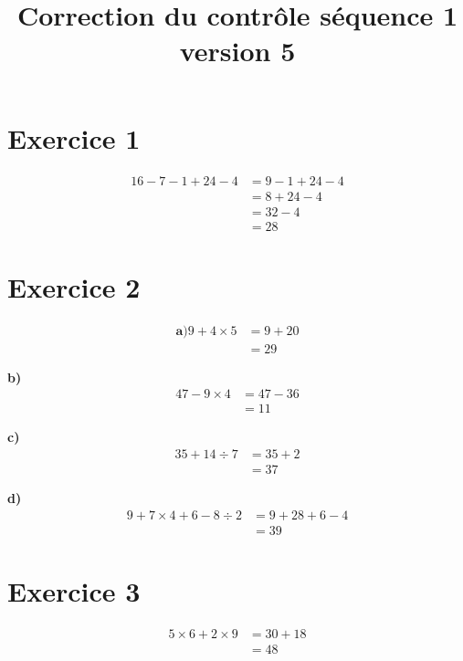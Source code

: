 \documentclass[12pt]{extarticle}
\title{\textbf{Correction du contrôle séquence 1 version 5}}
\author{}
\date{}
\begin{document}
\maketitle

\section*{Exercice 1}
\begin{align*}
16 - 7 - 1 + 24 - 4 &= 9 - 1 + 24 - 4 \\
                     &= 8 + 24 - 4 \\
                     &= 32 - 4 \\
                     &= 28
\end{align*}

\section*{Exercice 2}

\begin{align*}
\textbf{a)}
9 + 4 \times 5 &= 9 + 20 \\
               &= 29
\end{align*}

\textbf{b)}
\begin{align*}
47 - 9 \times 4 &= 47 - 36 \\
                &= 11
\end{align*}

\textbf{c)}
\begin{align*}
35 + 14 \div 7 &= 35 + 2 \\
               &= 37
\end{align*}

\textbf{d)}
\begin{align*}
9 + 7 \times 4 + 6 - 8 \div 2 &= 9 + 28 + 6 - 4 \\
                              &= 39
\end{align*}

\section*{Exercice 3}
\begin{align*}
5 \times 6 + 2 \times 9 &= 30 + 18 \\
                        &= 48
\end{align*}
\end{document}
